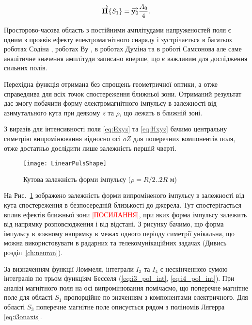 \begin{equation*} \begin{aligned} 
\overrightarrow{\mathbf H} \{ S_1 \} = \overrightarrow{\mathbf y_0} \frac{A_0}{4}.
\end{aligned} \end{equation*}

Просторово-часова область з  постійними амплітудами напруженостей поля є 
одним з проявів ефекту електромагнітного снаряду і
зустрічається в багатьох роботах Содіна \cite{imp:Sodin1991, 
imp:Sodin1992-5, imp:Sodin1992-10, imp:Sodin1997}, роботах Ву 
\cite{imp:Wu1985, imp:Wu1987, imp:Wu1991}, в роботах Думіна
\cite{imp:Dumin1996} та в роботі Самсонова \cite{imp:Samsonov1986} але 
саме аналітичне значення амплітуди записано вперше, що є важливим для 
дослідження сильних полів.

Перехідна функція отримана без спрощень геометричної оптики, а отже 
справедлива для всіх точок спостереження ближньої зони. Отриманий результат 
дає змогу побачити форму електромагнітного імпульсу в залежності від 
азимутального кута при деякому $ z $ та $ \rho $, що лежать в ближній зоні.

З виразів для інтенсивності поля \eqref{eq:Exyz} та \eqref{eq:Hxyz} бачимо
центральну симетрію випромінювання відносно осі $ oZ $ для поперечних 
компонентів поля, отже достатньо дослідити лише залежність першій чверті.

\begin{figure}[h] \begin{center}
\texttt{[image: LinearPulsShape]}
\caption{Кутова залежність форми імпульсу ($ \rho = R/2 .. 2R $ м)} 
\label{fig:emp_shape}
\end{center} \end{figure}

На Рис.~\ref{fig:emp_shape} зображено залежність форми випроміненого 
імпульсу в залежності від кута спостереження в безпосередній близькості 
до джерела. Тут спостерігається вплив ефектів ближньої зони 
\textcolor{red}{[ПОСИЛАННЯ]}, при яких форма імпульсу залежить від напрямку 
розповсюдження і від відстані. З рисунку бачимо, що форма імпульсу в 
кожному напрямку в межах одного періоду симетрії унікальна, що можна 
використовувати в радарних та телекомунікаційних задачах 
(Дивись розділ~\ref{ch:neuron}).

За визначенням функції Ломмеля, інтеграли $ I_3 $ та $ I_4 $ є 
нескінченною сумою інтегралів по трьом функціям Бесселя 
(\eqref{eq:i3_pol_int}, \eqref{eq:i4_pol_int}). При аналізі магнітного 
поля на осі випромінювання помічаємо, що поперечне магнітне поле для 
області $ S_1 $ пропорційне по значенням з компонентами 
електричного. Для області $ S_3 $ поперечне магнітне поле описується 
рядом з поліномів Лягерра \eqref{eq:i3onaxis}.

